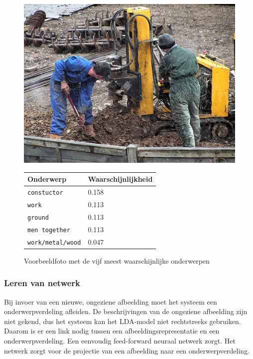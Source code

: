 \begin{figure}[h]
	\centering
	\begin{minipage}[t]{.5\linewidth}
		\centering
		\vspace{0pt}
		\includegraphics[width=\textwidth]{Images/LDA/5402085.jpg}
	\end{minipage}\hfill
	\begin{minipage}[t]{.5\textwidth}
		\centering
		\vspace{0pt}
		\begin{tabular}{ll}
			Onderwerp                           & Waarschijnlijkheid\\
			\hline
			\texttt{constuctor}             & 0.158 \\
			\texttt{work}                   & 0.113 \\
			\texttt{ground}                 & 0.113 \\
			\texttt{men together}           & 0.113 \\
			\texttt{work/metal/wood}        & 0.047\\
			\hline
		\end{tabular}
	\end{minipage}
	\caption{Voorbeeldfoto met de vijf meest waarschijnlijke onderwerpen}
	\label{fig:ldatopics}
\end{figure}

\subsubsection{Leren van netwerk}
\label{sec:LDAprediction}
Bij invoer van een nieuwe, ongeziene afbeelding moet het systeem een onderwerpverdeling afleiden. De beschrijvingen van de ongeziene afbeelding zijn niet gekend, dus het systeem kan het LDA-model niet rechtstreeks gebruiken. Daarom is er een link nodig tussen een afbeeldingsrepresentatie en een onderwerpverdeling. Een eenvoudig feed-forward neuraal netwerk zorgt. 
Het netwerk zorgt voor de projectie van een afbeelding naar een onderwerpverdeling.

